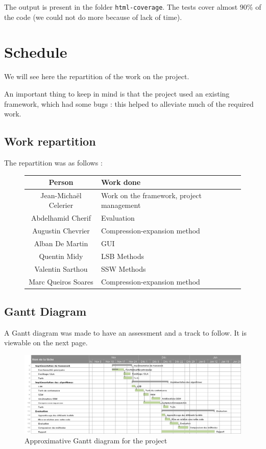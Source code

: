The output is present in the folder \texttt{html-coverage}. The tests cover almost $90\%$ of the code (we could not do more because of lack of time).

\section{Schedule}
We will see here the repartition of the work on the project.

An important thing to keep in mind is that the project used an existing framework, which had some bugs : this helped to alleviate much of the required work.

\subsection{Work repartition}
The repartition was as follows : 
\begin{figure}[h!]
\centering
\begin{tabular}{|c|l|}
\hline
Person & Work done \\
\hline
Jean-Michaël Celerier & Work on the framework, project management \\
Abdelhamid Cherif & Evaluation \\
Augustin Chevrier & Compression-expansion method \\
Alban De Martin & \ac{GUI} \\
Quentin Midy & \ac{LSB} Methods \\
Valentin Sarthou & \ac{SSW} Methods \\
Marc Queiros Soares & Compression-expansion method \\
\hline
\end{tabular}
\end{figure}

\subsection{Gantt Diagram}
A Gantt diagram was made to have an assessment and a track to follow. It is viewable on the next page.

\begin{figure}
\centering
\includegraphics[scale=0.65]{images/gantt.png}
\caption{Approximative Gantt diagram for the project}
\label{gantt}
\end{figure}
